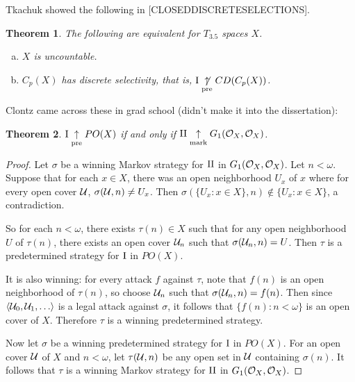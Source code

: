 \documentclass[11pt]{article}
\theoremstyle{plain}
\newtheorem{theorem}{Theorem}
\theoremstyle{definition}
\theoremstyle{remark}
\theoremstyle{plain}
\theoremstyle{definition}
\theoremstyle{remark}
\begin{document}
Tkachuk showed the following in [CLOSEDDISCRETESELECTIONS].

\begin{theorem}
The following are equivalent for \(T_{3.5}\) spaces \(X\).
\begin{enumerate}[a)]
\item \(X\) is uncountable.
\item \(C_p(X)\) has discrete selectivity, that is,
      \(\mathrm{I}\underset{\text{pre}}{\not\uparrow} CD(C_p(X))\).
\end{enumerate}
\end{theorem}

Clontz came across these in grad school (didn't make it into the dissertation):

\renewcommand{\rothGame}[1]{\ensuremath{G_1(\mc O_{#1},\mc O_{#1})}}
\begin{theorem}
\(\mathrm{I}\underset{\text{pre}}{\uparrow} PO(X)\) if and only if \(\plII\markwin\rothGame{X}\).
\end{theorem} 
\begin{proof}
Let \(\sigma\) be a winning Markov strategy for \(\mathrm{II}\) in \(\rothGame{X}\).
Let \(n<\omega\). Suppose that for each \(x\in X\), there was an open neighborhood 
\(U_x\) of \(x\) where for every open cover \(\mathcal{U}\), \(\sigma(\mathcal{U},n)\not=U_x\). 
Then \(\sigma(\{U_x : x\in X\},n)\not\in\{U_x:x\in X\}\), a contradiction.

So for each \(n<\omega\), there exists \(\tau(n)\in X\) such that for any
open neighborhood \(U\) of \(\tau(n)\), there exists an open cover \(\mathcal{U}_n\)
such that \(\sigma(\mathcal{U}_n,n)=U\). Then \(\tau\) is a predetermined strategy for
\(\mathrm{I}\) in \(PO(X)\).

It is also winning: for every attack \(f\) against \(\tau\), note that
\(f(n)\) is an open neighborhood of \(\tau(n)\), so choose \(\mathcal{U}_n\)
such that \(\sigma(\mathcal{U}_n,n)=f(n)\). Then since \(\<\mc U_0,\mc U_1,\dots\>\)
is a legal attack against \(\sigma\), it follows that \(\{f(n):n<\omega\}\)
is an open cover of \(X\). Therefore \(\tau\) is a winning predetermined
strategy.

Now let \(\sigma\) be a winning predetermined strategy for \(\mathrm{I}\) in \(PO(X)\).
For an open cover \(\mathcal{U}\) of \(X\) and \(n<\omega\), let \(\tau(\mathcal{U},n)\)
be any open set in \(\mathcal{U}\) containing \(\sigma(n)\). It follows
that \(\tau\) is a winning Markov strategy for \(\mathrm{II}\) in \(\rothGame{X}\).
\end{proof}
\end{document}
